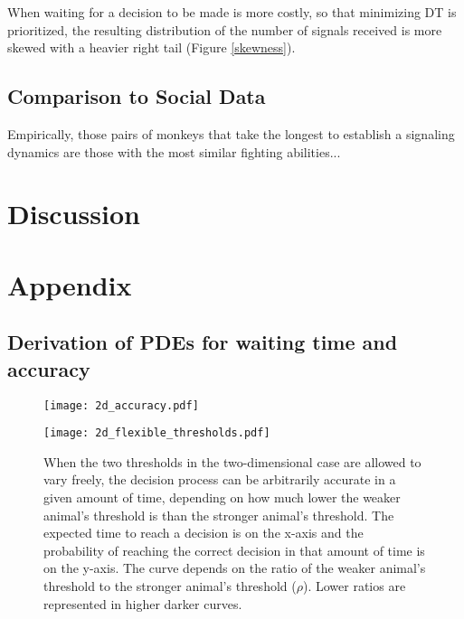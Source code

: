 \documentclass{article}
\begin{document}
When waiting for a decision to be made is more costly, so that minimizing DT is prioritized, the resulting distribution of the number of signals received is more skewed with a heavier right tail (Figure \ref{skewness}).

\subsection{Comparison to Social Data }
Empirically, those pairs of monkeys that take the longest to establish a signaling dynamics are those with the most similar fighting abilities...

\section{Discussion}


\section{Appendix}

\subsection{Derivation of PDEs for waiting time and accuracy \label{pdes_deriv}}

\begin{figure}
\texttt{[image: 2d\_accuracy.pdf]}
\caption{\label{2dacc} }
\end{figure}

\begin{figure}
\texttt{[image: 2d\_flexible\_thresholds.pdf]}
\caption{\label{2dflex} When the two thresholds in the two-dimensional case are allowed to vary freely, the decision process can be arbitrarily accurate in a given amount of time, depending on how much lower the weaker animal's threshold is than the stronger animal's threshold.  The expected time to reach a decision is on the x-axis and the probability of reaching the correct decision in that amount of time is on the y-axis.  The curve depends on the ratio of the weaker animal's threshold to the stronger animal's threshold ($\rho$).  Lower ratios are represented in higher darker curves.}
\end{figure}

\begin{figure}

\caption{\label{givingup} }
\end{figure}
\end{document}
